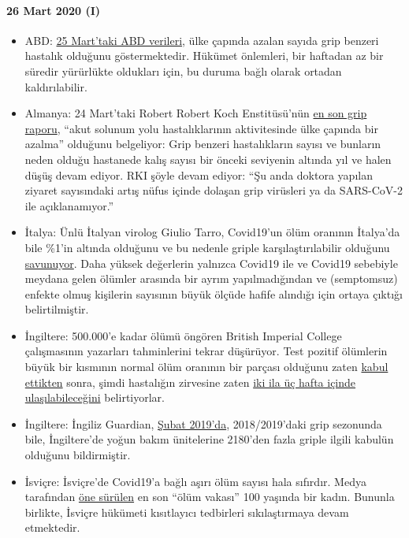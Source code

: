\hypertarget{26-mart-2020-i}{%
\paragraph{26 Mart 2020 (I)}\label{26-mart-2020-i}}

\begin{itemize}
\tightlist
\item
  ABD: \href{https://healthweather.us/}{25 Mart'taki ABD verileri}, ülke
  çapında azalan sayıda grip benzeri hastalık olduğunu göstermektedir.
  Hükümet önlemleri, bir haftadan az bir süredir yürürlükte oldukları
  için, bu duruma bağlı olarak ortadan kaldırılabilir.
\item
  Almanya: 24 Mart'taki Robert Robert Koch Enstitüsü'nün
  \href{https://influenza.rki.de/Wochenberichte/2019_2020/2020-12.pdf}{en
  son grip raporu}, ``akut solunum yolu hastalıklarının aktivitesinde
  ülke çapında bir azalma'' olduğunu belgeliyor: Grip benzeri
  hastalıkların sayısı ve bunların neden olduğu hastanede kalış sayısı
  bir önceki seviyenin altında yıl ve halen düşüş devam ediyor. RKI
  şöyle devam ediyor: ``Şu anda doktora yapılan ziyaret sayısındaki
  artış nüfus içinde dolaşan grip virüsleri ya da SARS-CoV-2 ile
  açıklanamıyor.''
\item
  İtalya: Ünlü İtalyan virolog Giulio Tarro, Covid19'un ölüm oranının
  İtalya'da bile \%1'in altında olduğunu ve bu nedenle griple
  karşılaştırılabilir olduğunu
  \href{https://www.cybermednews.eu/index.php/it/health/70871-interview-to-the-virologist-giulio-tarro-the-death-rate-of-covid-19-is-less-than-1-as-confirmed-by-the-national-institute-of-allergy-and-infectious-diseases}{savunuyor}.
  Daha yüksek değerlerin yalnızca Covid19 ile ve Covid19 sebebiyle
  meydana gelen ölümler arasında bir ayrım yapılmadığından ve
  (semptomsuz) enfekte olmuş kişilerin sayısının büyük ölçüde hafife
  alındığı için ortaya çıktığı belirtilmiştir. 
\item
  İngiltere: 500.000'e kadar ölümü öngören British Imperial College
  çalışmasının yazarları tahminlerini tekrar düşürüyor. Test pozitif
  ölümlerin büyük bir kısmının normal ölüm oranının bir parçası olduğunu
  zaten \href{https://www.bbc.com/news/health-51979654}{kabul ettikten}
  sonra, şimdi hastalığın zirvesine zaten
  \href{https://www.thetimes.co.uk/article/nhs-now-likely-to-cope-with-coronavirus-says-key-scientist-rn5m6nggk}{iki
  ila üç hafta içinde ulaşılabileceğini} belirtiyorlar. 
\item
  İngiltere: İngiliz Guardian,
  \href{https://www.theguardian.com/society/2019/feb/20/britons-urged-to-get-flu-vaccine-as-critical-cases-rise-above-2000}{Şubat
  2019'da}, 2018/2019'daki grip sezonunda bile, İngiltere'de yoğun bakım
  ünitelerine 2180'den fazla griple ilgili kabulün olduğunu
  bildirmiştir.
\item
  İsviçre: İsviçre'de Covid19'a bağlı aşırı ölüm sayısı hala sıfırdır.
  Medya tarafından
  \href{https://www.nau.ch/ort/basel/drei-weitere-covid-19-todesfalle-in-basel-stadt-65684099}{öne
  sürülen} en son ``ölüm vakası'' 100 yaşında bir kadın. Bununla
  birlikte, İsviçre hükümeti kısıtlayıcı tedbirleri sıkılaştırmaya devam
  etmektedir.\\
\end{itemize}

